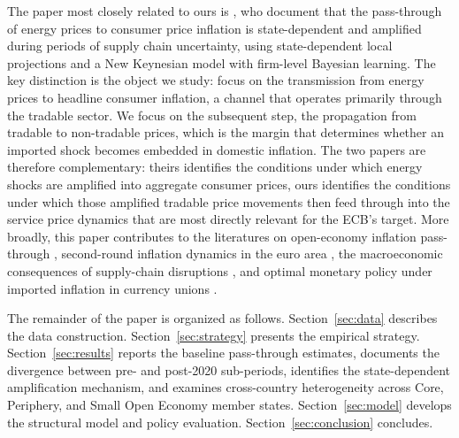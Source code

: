 \documentclass[a4paper,12pt]{article}
\begin{document}
The paper most closely related to ours is , who document that the pass-through of energy prices to consumer price inflation is state-dependent and amplified during periods of supply chain uncertainty, using state-dependent local projections and a New Keynesian model with firm-level Bayesian learning. The key distinction is the object we study:  focus on the transmission from energy prices to headline consumer inflation, a channel that operates primarily through the tradable sector. We focus on the subsequent step, the propagation from tradable to non-tradable prices, which is the margin that determines whether an imported shock becomes embedded in domestic inflation. The two papers are therefore complementary: theirs identifies the conditions under which energy shocks are amplified into aggregate consumer prices, ours identifies the conditions under which those amplified tradable price movements then feed through into the service price dynamics that are most directly relevant for the ECB's target. More broadly, this paper contributes to the literatures on open-economy inflation pass-through \cite{BursteinGopinath2014, CorsettiDedolaLeduc2008}, second-round inflation dynamics in the euro area \cite{BobeicaJarocinski2019}, the macroeconomic consequences of supply-chain disruptions \cite{AscariBonamSmadu2024, BenignodiGiovannietal2022}, and optimal monetary policy under imported inflation in currency unions \cite{GaliMonacelli2005, FaiaMonacelli2008}.

The remainder of the paper is organized as follows. Section~\ref{sec:data} describes the data construction. Section~\ref{sec:strategy} presents the empirical strategy. Section~\ref{sec:results} reports the baseline pass-through estimates, documents the divergence between pre- and post-2020 sub-periods, identifies the state-dependent amplification mechanism, and examines cross-country heterogeneity across Core, Periphery, and Small Open Economy member states. Section~\ref{sec:model} develops the structural model and policy evaluation. Section~\ref{sec:conclusion} concludes.

\end{document}
